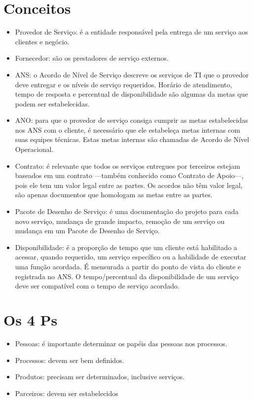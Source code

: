 \section{Conceitos}
\label{sec:design:conc}
\begin{itemize}
    \item Provedor de Serviço: é a entidade responsável pela entrega de um
        serviço aos clientes e negócio.
    \item Fornecedor: são os prestadores de serviço externos.
    \item ANS: o Acordo de Nível de Serviço descreve os serviços de TI que o
        provedor deve entregar e os níveis de serviço requeridos. Horário de
        atendimento, tempo de resposta e percentual de disponibilidade são
        algumas da metas que podem ser estabelecidas.
    \item ANO: para que o provedor de serviço consiga cumprir as metas
        estabelecidas nos ANS com o cliente, é necessário que ele estabeleça
        metas internas com suas equipes técnicas. Estas metas internas são
        chamadas de Acordo de Nível Operacional.
    \item Contrato: é relevante que todos os serviços entregues por terceiros
        estejam baseados em um contrato ---também conhecido como Contrato de
        Apoio---, pois ele tem um valor legal entre as partes. Os acordos não
        têm valor legal, são apenas documentos que homologam as metas entre as
        partes.
    \item Pacote de Desenho de Serviço: é uma documentação do projeto para cada
        novo serviço, mudança de grande impacto, remoção de um serviço ou
        mudança em um Pacote de Desenho de Serviço.
    \item Disponibilidade: é a proporção de tempo que um cliente está
        habilitado a acessar, quando requerido, um serviço específico ou a
        habilidade de executar uma função acordada. É mensurada a partir do
        ponto de vista do cliente e registrada no ANS. O tempo/percentual da
        disponibilidade de um serviço deve ser compatível com o tempo de
        serviço acordado.
\end{itemize}


\section{Os 4 Ps}
\label{sec:design:4ps}
\begin{itemize}
    \item Pessoas: é importante determinar os papéis das pessoas nos processos.
    \item Processos: devem ser bem definidos.
    \item Produtos: precisam ser determinados, inclusive serviços.
    \item Parceiros: devem ser estabelecidos
\end{itemize}

